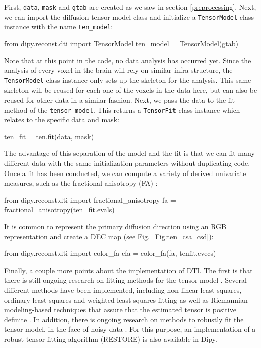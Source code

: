 \documentclass{bioinfo}
\begin{document}
First, \texttt{data}, \texttt{mask} and \texttt{gtab} are created as we saw in
section \ref{preprocessing}. Next, we can import the diffusion tensor model class
and initialize a \texttt{TensorModel} class instance with the name
\texttt{ten\_model}:
\begin{python}
from dipy.reconst.dti import TensorModel
ten_model = TensorModel(gtab)
\end{python}
Note that at this point in the code, no data analysis has occurred yet. Since
the analysis of every voxel in the brain will rely on similar infra-structure,
the \texttt{TensorModel} class instance only sets up the skeleton for the
analysis. This same skeleton will be reused for each one of the voxels in the
data here, but can also be reused for other data in a similar fashion.  Next,
we pass the data to the fit method of the \texttt{tensor\_model}. This returns
a \texttt{TensorFit} class instance which relates to the specific data and
mask:
\begin{python}
ten_fit = ten.fit(data, mask)
\end{python}
The advantage of this separation of the model and the fit is that we can fit
many different data with the same initialization parameters without duplicating
code. Once a fit has been conducted, we can compute a variety of derived
univariate measures, such as the fractional anisotropy (FA) \citep{Basser1996}:
\begin{python}
from dipy.reconst.dti import fractional_anisotropy
fa = fractional_anisotropy(ten_fit.evals)
\end{python}
It is common to represent the primary diffusion direction using an RGB
representation and create a DEC map \citep{pierpaoli-jezzard-etal:96}
(see Fig.~\ref{Fig:ten_csa_csd}):
\begin{python}
from dipy.reconst.dti import color_fa
cfa = color_fa(fa, tenfit.evecs)
\end{python}
Finally, a couple more points about the implementation of DTI. The first is that
there is still ongoing research on fitting methods for the tensor model
\citep{Koay2006}. Several different methods have been implemented, including
non-linear least-squares, ordinary least-squares and weighted least-squares
fitting \citep{chung-lu-etal:06} as well as Riemannian modeling-based
techniques that assure that the estimated tensor is positive definite
\citep{lenglet-rousson-etal:jmiv,arsigny-fillard-etal:06}. In
addition, there is ongoing research on
methods to robustly fit the tensor model, in the face of noisy data
\citep{Chang2005, Chang2012}. For this purpose, an implementation of a robust
tensor fitting algorithm (RESTORE) is also available in Dipy.
\end{document}
